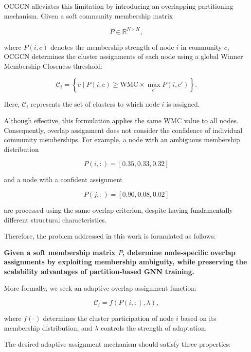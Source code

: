 \documentclass[a4paper,11pt,oneside,onecolumn,preprint]{elsarticle}
\numberwithin{equation}{section}
\begin{document}
OCGCN alleviates this limitation by introducing an overlapping partitioning mechanism.
Given a soft community membership matrix

\begin{equation}
P\in\mathbb{R}^{N\times K},
\end{equation}

where $P(i,c)$ denotes the membership strength of node $i$ in community $c$, OCGCN determines the cluster assignments of each node using a global Winner Membership Closeness threshold:

\begin{equation}
\mathcal{C}_i
=
\left\{
c \mid
P(i,c)\geq
\mathrm{WMC}\times
\max_{c'}P(i,c')
\right\}.
\label{eq:ocgcn-assignment}
\end{equation}

Here, $\mathcal{C}_i$ represents the set of clusters to which node $i$ is assigned.

Although effective, this formulation applies the same $\mathrm{WMC}$ value to all nodes.
Consequently, overlap assignment does not consider the confidence of individual community memberships.
For example, a node with an ambiguous membership distribution

\[
P(i,:)=[0.35,0.33,0.32]
\]

and a node with a confident assignment

\[
P(j,:)=[0.90,0.08,0.02]
\]

are processed using the same overlap criterion, despite having fundamentally different structural characteristics.

Therefore, the problem addressed in this work is formulated as follows:

\textbf{Given a soft membership matrix $P$, determine node-specific overlap assignments by exploiting membership ambiguity, while preserving the scalability advantages of partition-based GNN training.}

More formally, we seek an adaptive overlap assignment function:

\begin{equation}
\mathcal{C}_i=f(P(i,:),\lambda),
\end{equation}

where $f(\cdot)$ determines the cluster participation of node $i$ based on its membership distribution, and $\lambda$ controls the strength of adaptation.

The desired adaptive assignment mechanism should satisfy three properties:
\end{document}
